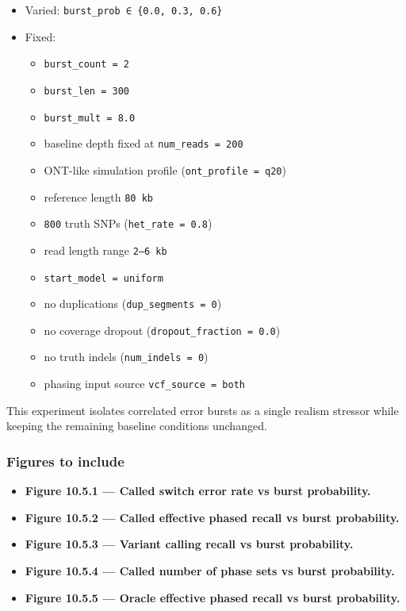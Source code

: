 \documentclass[
]{article}
\providecommand{\tightlist}{%
  \setlength{\itemsep}{0pt}\setlength{\parskip}{0pt}}
\begin{document}
\begin{itemize}
\tightlist
\item
  Varied: \texttt{burst\_prob\ ∈\ \{0.0,\ 0.3,\ 0.6\}}
\item
  Fixed:

  \begin{itemize}
  \tightlist
  \item
    \texttt{burst\_count\ =\ 2}
  \item
    \texttt{burst\_len\ =\ 300}
  \item
    \texttt{burst\_mult\ =\ 8.0}
  \item
    baseline depth fixed at \texttt{num\_reads\ =\ 200}
  \item
    ONT-like simulation profile (\texttt{ont\_profile\ =\ q20})
  \item
    reference length \texttt{80\ kb}
  \item
    \texttt{800} truth SNPs (\texttt{het\_rate\ =\ 0.8})
  \item
    read length range \texttt{2–6\ kb}
  \item
    \texttt{start\_model\ =\ uniform}
  \item
    no duplications (\texttt{dup\_segments\ =\ 0})
  \item
    no coverage dropout (\texttt{dropout\_fraction\ =\ 0.0})
  \item
    no truth indels (\texttt{num\_indels\ =\ 0})
  \item
    phasing input source \texttt{vcf\_source\ =\ both}
  \end{itemize}
\end{itemize}

This experiment isolates correlated error bursts as a single realism
stressor while keeping the remaining baseline conditions unchanged.

\subsubsection{Figures to include}\label{figures-to-include-3}

\begin{itemize}
\tightlist
\item
  \textbf{Figure 10.5.1 --- Called switch error rate vs burst
  probability.}
\item
  \textbf{Figure 10.5.2 --- Called effective phased recall vs burst
  probability.}
\item
  \textbf{Figure 10.5.3 --- Variant calling recall vs burst
  probability.}
\item
  \textbf{Figure 10.5.4 --- Called number of phase sets vs burst
  probability.}
\item
  \textbf{Figure 10.5.5 --- Oracle effective phased recall vs burst
  probability.}
\end{itemize}
\end{document}
